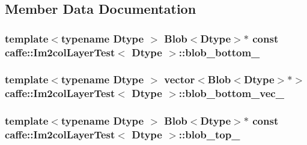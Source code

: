 \subsection{Member Data Documentation}
\hypertarget{classcaffe_1_1_im2col_layer_test_a8dcff9e3ad57f57c4e1ca6771be34554}{
\subsubsection[{blob\+\_\+bottom\+\_\+}]{\setlength{\rightskip}{0pt plus 5cm}template$<$typename Dtype $>$ {\bf Blob}$<$Dtype$>$$\ast$ const {\bf caffe\+::\+Im2col\+Layer\+Test}$<$ Dtype $>$\+::blob\+\_\+bottom\+\_\+\hspace{0.3cm}{\ttfamily [protected]}}}\label{classcaffe_1_1_im2col_layer_test_a8dcff9e3ad57f57c4e1ca6771be34554}
\hypertarget{classcaffe_1_1_im2col_layer_test_ac9dfa820b4759b538a459cb5429943b1}{
\subsubsection[{blob\+\_\+bottom\+\_\+vec\+\_\+}]{\setlength{\rightskip}{0pt plus 5cm}template$<$typename Dtype $>$ vector$<${\bf Blob}$<$Dtype$>$$\ast$$>$ {\bf caffe\+::\+Im2col\+Layer\+Test}$<$ Dtype $>$\+::blob\+\_\+bottom\+\_\+vec\+\_\+\hspace{0.3cm}{\ttfamily [protected]}}}\label{classcaffe_1_1_im2col_layer_test_ac9dfa820b4759b538a459cb5429943b1}
\hypertarget{classcaffe_1_1_im2col_layer_test_a04f605a94d9b6ead927c47c754b459b2}{
\subsubsection[{blob\+\_\+top\+\_\+}]{\setlength{\rightskip}{0pt plus 5cm}template$<$typename Dtype $>$ {\bf Blob}$<$Dtype$>$$\ast$ const {\bf caffe\+::\+Im2col\+Layer\+Test}$<$ Dtype $>$\+::blob\+\_\+top\+\_\+\hspace{0.3cm}{\ttfamily [protected]}}}\label{classcaffe_1_1_im2col_layer_test_a04f605a94d9b6ead927c47c754b459b2}
